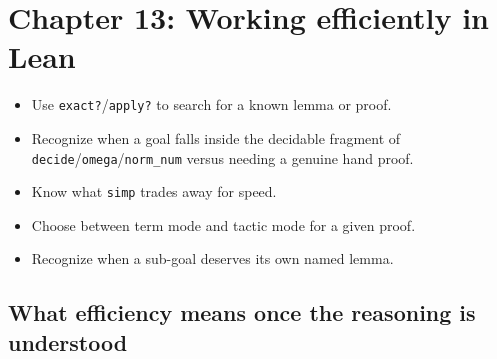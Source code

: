 \chapter{Chapter 13: Working efficiently in Lean}\label{sec:13-working-efficiently:00-index:1}

\begin{learningobjectives}
\begin{itemize}
\tightlist
\item
  Use \texttt{exact?}/\texttt{apply?} to search for a known lemma or proof.
\item
  Recognize when a goal falls inside the decidable fragment of \texttt{decide}/\texttt{omega}/\texttt{norm\_\allowbreak{}num} versus needing a genuine hand proof.
\item
  Know what \texttt{simp} trades away for speed.
\item
  Choose between term mode and tactic mode for a given proof.
\item
  Recognize when a sub-goal deserves its own named lemma.
\end{itemize}
\end{learningobjectives}


\section{What efficiency means once the reasoning is understood}\label{sec:13-working-efficiently:00-index:2}

